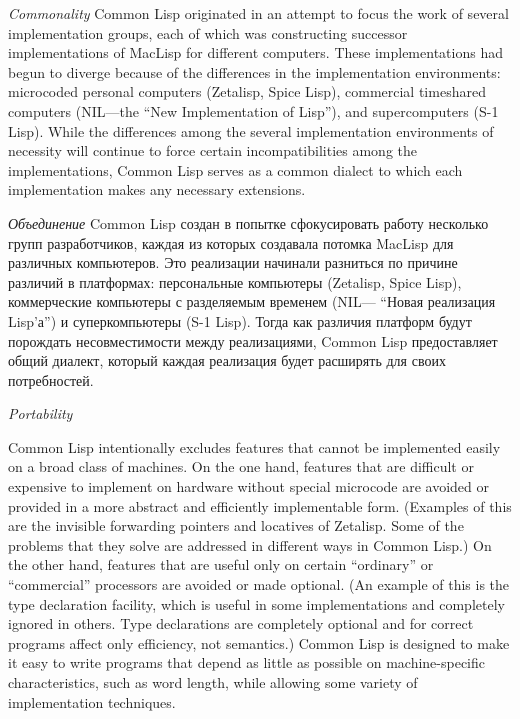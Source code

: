 \begin{flushdesc}
\item[{\it Commonality}]
Common Lisp originated in an attempt to focus the
work of several implementation groups, each of which was constructing successor
implementations of MacLisp for different computers.  These
implementations had begun to diverge because of the differences in the
implementation environments: microcoded personal computers (Zetalisp,
Spice Lisp), commercial timeshared computers (NIL---the ``New Implementation of
Lisp''), and supercomputers (S-1 Lisp).  While the differences among the several
implementation environments of necessity will continue to force
certain incompatibilities among the
implementations, Common Lisp serves as a common dialect to
which each implementation makes any necessary extensions.

\item[{\it Объединение}]
Common Lisp создан в попытке сфокусировать работу несколько групп
разработчиков, каждая из которых создавала потомка MacLisp для
различных компьютеров. Это реализации начинали разниться по
причине различий в платформах: персональные компьютеры (Zetalisp,
Spice Lisp), коммерческие компьютеры с разделяемым временем
(NIL--- ``Новая реализация Lisp'а'') и суперкомпьютеры (S-1
Lisp). Тогда как различия платформ будут порождать несовместимости
между реализациями, Common Lisp предоставляет общий диалект,
который каждая реализация будет расширять для своих потребностей.

\item[{\it Portability}]

\begingroup{}
Common Lisp intentionally excludes features
that cannot be implemented easily on a broad class of machines.
On the one hand, features that are difficult or expensive
to implement on hardware without special microcode are avoided
or provided in a more abstract and efficiently implementable form.
(Examples of this are the invisible forwarding pointers
and locatives of Zetalisp.  Some of the problems that they solve
are addressed in different ways in Common Lisp.)
On the other hand, features that are useful only on certain ``ordinary''
or ``commercial'' processors are avoided or made optional.  (An example of
this is the type declaration facility, which is useful in some
implementations and completely ignored in others.  Type declarations are
completely optional and for correct programs
affect only efficiency, not semantics.)
Common Lisp is designed to make it easy to write programs
that depend as little as possible on machine-specific
characteristics, such as word length, while allowing some variety of
implementation \hbox{techniques}.
\par\endgroup


\end{flushdesc}

